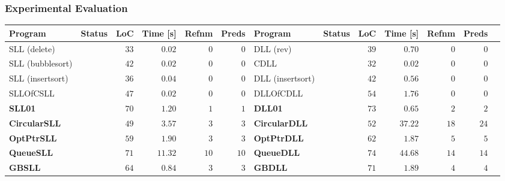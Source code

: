 \documentclass{beamer}
\newcommand{\hcol}[1]{yellow!20!orange!20}
\newcommand{\scol}[1]{blue!40}
\begin{document}
\begin{frame}
\frametitle{Experimental Evaluation}

	\begin{center}
	\begin{adjustbox}{max height=\textheight, max width=\textwidth}
	\begin{tabular}{| l | l | r | r | r | r || l | l | r | r | r | r | r |}
        \hline
		Program & Status & LoC & Time [s] & Refnm& Preds & Program & Status & LoC & Time [s] & Refnm & Preds \\
        \hline
        \hline
		SLL (delete) & \cellcolor{\scol{}} \safe & $33$ & $0.02$ &  $0$ & $0$ & DLL (rev) & \cellcolor{\scol{}} \safe & $39$ &  $0.70$ & $0$  & $0$ \\
        \hline
		SLL (bubblesort) & \cellcolor{\scol{}} \safe & $42$ & $0.02$ &  $0$ & $0$ & CDLL & \cellcolor{\scol{}} \safe & $32$ &  $0.02$  & $0$  & $0$ \\
        \hline
		SLL (insertsort) & \cellcolor{\scol{}} \safe & $36$ & $0.04$ & $0$ & $0$ & DLL (insertsort) & \cellcolor{\scol{}} \safe & $42$ &  $0.56$  & $0$  & $0$ \\
        \hline
		SLLOfCSLL & \cellcolor{\scol{}} \safe & $47$ & $0.02$ & $0$ & $0$ & DLLOfCDLL & \cellcolor{\scol{}} \safe & $54$ &  $1.76$  & $0$  & $0$ \\
        \hline
		\rowcolor{\hcol{}}
		\textbf{SLL01}    & \cellcolor{\scol{}} \safe & $70$ & $1.20$   &  $1$ & $1$ & \textbf{DLL01} & \cellcolor{\scol{}} \safe & $73$ &  $0.65$  & $2$  & $2$ \\
        \hline
		\rowcolor{\hcol{}}
		\textbf{CircularSLL} & \cellcolor{\scol{}} \safe & $49$ & $3.57$   &  $3$  & $3$ & \textbf{CircularDLL} & \cellcolor{\scol{}} \safe  & $52$ &  $37.22$ & $18$ & $24$ \\
        \hline
		\rowcolor{\hcol{}}
		\textbf{OptPtrSLL}   & \cellcolor{\scol{}} \safe & $59$ & $1.90$ & $3$ & $3$ & \textbf{OptPtrDLL} &\cellcolor{\scol{}} \safe & $62$ &  $1.87$  & $5$ & $5$ \\
        \hline
		\rowcolor{\hcol{}}
		\textbf{QueueSLL}    & \cellcolor{\scol{}} \safe & $71$ & $11.32$  &  $10$ & $10$ & \textbf{QueueDLL} &  \cellcolor{\scol{}}  \safe  & $74$ &  $44.68$ & $14$ & $14$ \\
		\rowcolor{\hcol{}}
        \hline
		\textbf{GBSLL}       & \cellcolor{\scol{}} \safe & $64$ & $0.84$   &  $3$ & $3$ & \textbf{GBDLL} &  \cellcolor{\scol{}}  \safe & $71$ &  $1.89$  & $4$ & $4$ \\

\end{tabular}
\end{adjustbox}
\end{center}
\end{frame}
\end{document}
